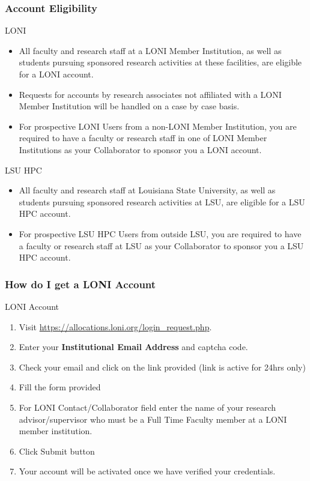 \documentclass[slidestop,mathserif,compress,xcolor=svgnames,table]{beamer}
\newenvironment{bblock}[0]
{
\begin{beamerboxesrounded}[upper=uppercol1,lower=lowercol1,shadow=true]}
{\end{beamerboxesrounded}}
\begin{document}
\begin{frame}
  \frametitle{\small Account Eligibility}
  \begin{bblock}{LONI}
    {\fontsize{9}{10}\selectfont
      \begin{itemize}
        \item All faculty and research staff at a LONI Member Institution, as well as students pursuing sponsored research activities at these facilities, are eligible for a LONI account. 
        \item Requests for accounts by research associates not affiliated with a LONI Member Institution will be handled on a case by case basis. 
        \item For prospective LONI Users from a non-LONI Member Institution, you are required to have a faculty or research staff in one of LONI Member Institutions as your Collaborator to sponsor you a LONI account.
      \end{itemize}
    }
  \end{bblock}
  \begin{bblock}{LSU HPC}
    {\fontsize{9}{10}\selectfont
      \begin{itemize}
        \item All faculty and research staff at Louisiana State University, as well as students pursuing sponsored research activities at LSU, are eligible for a LSU HPC account. 
        \item For prospective LSU HPC Users from outside LSU, you are required to have a faculty or research staff at LSU as your Collaborator to sponsor you a LSU HPC account.
      \end{itemize}
    }
  \end{bblock}
\end{frame}

\begin{frame}
  \frametitle{\small How do I get a LONI Account}
  \begin{bblock}{LONI Account}
    \begin{enumerate}
      \item Visit \url{https://allocations.loni.org/login_request.php}.
      \item Enter your \textbf{Institutional Email Address} and captcha code.
      \item Check your email and click on the link provided (link is active for 24hrs only)
      \item Fill the form provided
      \item For LONI Contact/Collaborator field enter the name of your research advisor/supervisor who must be a Full Time Faculty member at a LONI member institution.
      \item Click Submit button
      \item Your account will be activated once we have verified your credentials.
    \end{enumerate}
  \end{bblock}
\end{frame}
\end{document}
